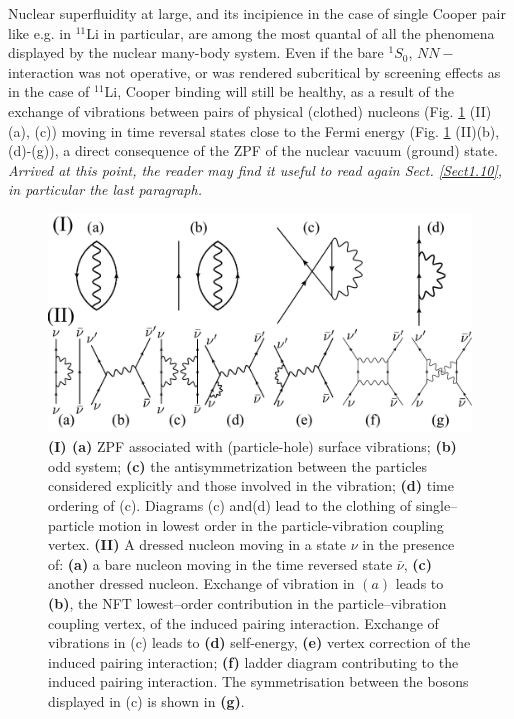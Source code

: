 \begin{subappendices}
Nuclear superfluidity at large, and its incipience in the case of single Cooper pair like e.g. in $^{11}$Li in particular, are among the most quantal of all  the phenomena displayed by the nuclear many-body 
system. Even if the bare $^1S_0$, $NN-$interaction was not operative, or was rendered subcritical by screening effects as in the case of $^{11}$Li, Cooper binding will still be healthy, as a result of the exchange of vibrations between pairs of physical (clothed) nucleons (Fig. \ref{fig6G1} (II) (a), (c)) moving in time reversal states close to the Fermi energy (Fig. \ref{fig6G1} (II)(b),(d)-(g)), a direct
consequence of the ZPF of the  nuclear vacuum (ground) state. \textit{Arrived at this point, the reader may find it useful to read again Sect. \ref{Sect1.10}, in particular the last paragraph.}
\begin{figure}
\centerline{\includegraphics[width=\textwidth]{C8/figsC8/fig6G1.pdf}}
\caption{{\bf (I) (a)} ZPF associated with (particle-hole) surface vibrations; 
{\bf (b)} odd system; {\bf (c)} the antisymmetrization between the particles  considered explicitly and 
those involved in the vibration; {\bf (d)} time ordering of (c). 
Diagrams (c) and(d) lead to the clothing of single--particle motion  in lowest order in the 
particle-vibration coupling vertex.
{\bf (II)} A dressed  nucleon moving in a state $\nu$ in the presence of: {\bf (a)} a bare nucleon
moving in the time reversed state $\bar \nu$,
{\bf (c)} another dressed nucleon. Exchange of vibration in $(a)$ leads to {\bf (b)}, the NFT 
lowest--order contribution in the particle--vibration coupling vertex, of the induced pairing interaction. Exchange 
of vibrations in {(c)}  leads to  {\bf (d)} self-energy, {\bf (e)} vertex correction of the  
induced pairing interaction;  {\bf (f)} ladder diagram contributing to the induced pairing interaction.
The symmetrisation between the bosons displayed in (c) is shown in {\bf (g)}.}\label{fig6G1}
\end{figure}


\end{subappendices}
